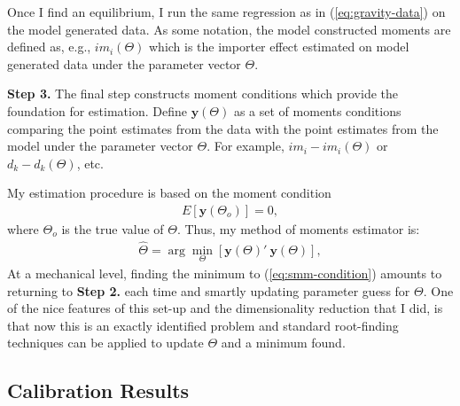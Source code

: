 \documentclass[12pt,pdftex]{article}
\begin{document}
\begin{onehalfspacing}
Once I find an equilibrium, I run the same regression as in (\ref{eq:gravity-data}) on the model generated data. As some notation, the model constructed moments are defined as, e.g., $im_{i}(\Theta)$ which is the importer effect estimated on model generated data under the parameter vector $\Theta$.

\textbf{Step 3.} The final step constructs moment conditions which provide the foundation for estimation. Define $\mathbf{y}(\Theta)$ as a set of moments conditions comparing the point estimates from the data with the point estimates from the model under the parameter vector $\Theta$. For example, ${im_{i}} - im_{i}(\Theta)$ or $d_k - d_k(\Theta)$, etc.

My estimation procedure is based on the moment condition
\begin{align}
E\left[\mathbf{y}(\Theta_o)\right] = 0,
\end{align}
where $\Theta_o$ is the true value of $\Theta$. Thus, my method of moments estimator is:
\begin{align}
\hat{\Theta} = \arg\min_{\Theta} \left[\mathbf{y}(\Theta)'\ \mathbf{y}(\Theta)\right], \label{eq:smm-condition}
\end{align}
At a mechanical level, finding the minimum to (\ref{eq:smm-condition}) amounts to returning to \textbf{Step 2.} each time and smartly updating parameter guess for $\Theta$. One of the nice features of this set-up and the dimensionality reduction that I did, is that now this is an exactly identified problem and standard root-finding techniques can be applied to update $\Theta$ and a minimum found.

\subsection{Calibration Results}



\end{onehalfspacing}
\end{document}
